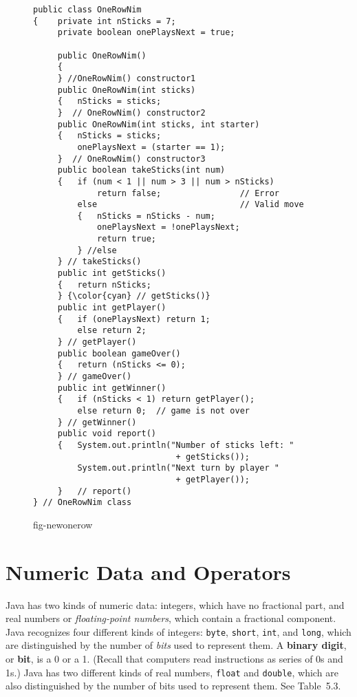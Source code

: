 \begin{figure}[h!]
\jjjprogstart
\begin{jjjlisting}
\begin{lstlisting}
public class OneRowNim
{    private int nSticks = 7;
     private boolean onePlaysNext = true;

     public OneRowNim()
     {
     } //OneRowNim() constructor1
     public OneRowNim(int sticks)
     {   nSticks = sticks;
     }  // OneRowNim() constructor2
     public OneRowNim(int sticks, int starter)
     {   nSticks = sticks;
         onePlaysNext = (starter == 1);
     }  // OneRowNim() constructor3
     public boolean takeSticks(int num)
     {   if (num < 1 || num > 3 || num > nSticks) 
             return false;                // Error
         else                             // Valid move
         {   nSticks = nSticks - num;
             onePlaysNext = !onePlaysNext;
             return true;
         } //else
     } // takeSticks()
     public int getSticks()
     {   return nSticks;
     } {\color{cyan} // getSticks()}
     public int getPlayer()
     {   if (onePlaysNext) return 1;
         else return 2;
     } // getPlayer()
     public boolean gameOver()
     {   return (nSticks <= 0);
     } // gameOver()
     public int getWinner()
     {   if (nSticks < 1) return getPlayer();
         else return 0;  // game is not over
     } // getWinner()
     public void report()
     {   System.out.println("Number of sticks left: " 
                             + getSticks());
         System.out.println("Next turn by player " 
                             + getPlayer());
     }   // report()
} // OneRowNim class
\end{lstlisting}
\end{jjjlisting}
{fig-newonerow}
\end{figure}


\section{Numeric Data and Operators}
\noindent Java has two kinds of numeric data: integers, which have no fractional
part, and real numbers or {\em floating-point numbers}, which contain
a fractional component.  Java recognizes four different kinds of
integers: {\tt byte}, {\tt short}, {\tt int}, and {\tt long}, which
are distinguished by the number of {\it bits} used to represent
them. A {\bf binary digit}, or {\bf bit}, is a 0 or a 1. (Recall that
computers read instructions as series of 0s and 1s.) Java has two
different kinds of real numbers, {\tt float} and {\tt double}, which
are also distinguished by the number of bits used to represent them.
See Table~5.3.

